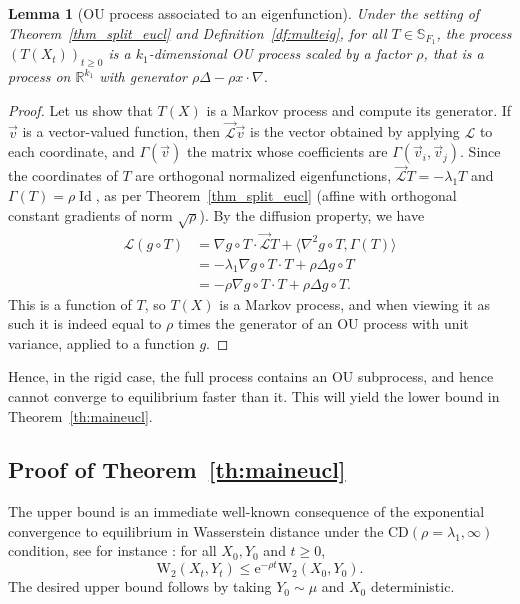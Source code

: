 \documentclass[10pt,reqno]{amsart}
\newtheorem{lemma}[theorem]{Lemma}
\numberwithin{equation}{section}
\begin{document}
\begin{lemma}[OU process associated to an eigenfunction] \label{lem_proj_ou}
  Under the setting of Theorem~\ref{thm_split_eucl} and
  Definition~\ref{df:multeig}, for all $T \in \mathbb{S}_{F_1}$, the process
  ${(T(X_t))}_{t\geq0}$ is a $k_1$-dimensional OU process scaled by a factor
  $\rho$, that is a process on $\mathbb{R}^{k_1}$ with generator
  $\rho \Delta - \rho x \cdot \nabla$.
\end{lemma}

\begin{proof}
  Let us show that $T(X)$ is a Markov process and compute its
  generator. %
  If $\vec{v}$ is a vector-valued function, then $\vec{\mathcal{L}} \vec{v} $
  is the vector obtained by applying $\mathcal{L}$ to each coordinate, and
  $\Gamma(\vec{v})$ the matrix whose coefficients are
  $\Gamma(\vec{v}_i, \vec{v}_j)$. Since the coordinates of $T$ are orthogonal
  normalized eigenfunctions, $\vec{\mathcal{L}} T = - \lambda_1 T$ and
  $\Gamma(T) = \rho \operatorname{Id}$, as per Theorem~\ref{thm_split_eucl}
  (affine with orthogonal constant gradients of norm $\sqrt{\rho}$). By the
  diffusion property, we have
  \begin{align}
    \mathcal{L}(g \circ T) &= \nabla g \circ T \cdot \vec{\mathcal{L}} T + \langle \nabla^2 g \circ T, \Gamma(T)\rangle \\
                  &= - \lambda_1 \nabla g\circ T \cdot T + \rho \Delta g \circ T \\
                  &= - \rho \nabla g\circ T \cdot T + \rho \Delta g \circ T.
  \end{align}
  This is a function of $T$, so $T(X)$ is a Markov process, and when viewing
  it as such it is indeed equal to $\rho$ times the generator of an OU process
  with unit variance, applied to a function $g$.
\end{proof}

Hence, in the rigid case, the full process contains an OU subprocess, and
hence cannot converge to equilibrium faster than it. This will yield the lower
bound in Theorem~\ref{th:maineucl}.

\subsection{Proof of Theorem~\ref{th:maineucl}}

The upper bound is an immediate well-known consequence of the exponential
convergence to equilibrium in Wasserstein distance under the
CD$(\rho=\lambda_1, \infty)$ condition, see for instance \cite{vRS05}: for all
$X_0,Y_0$ and $t\geq0$,
\begin{equation}
  \mathrm{W}_2(X_t, Y_t) 
  \leq \mathrm{e}^{-\rho t}\mathrm{W}_2(X_0, Y_0).
\end{equation}
The desired upper bound follows by taking $Y_0\sim\mu$ and $X_0$
deterministic.
\end{document}
